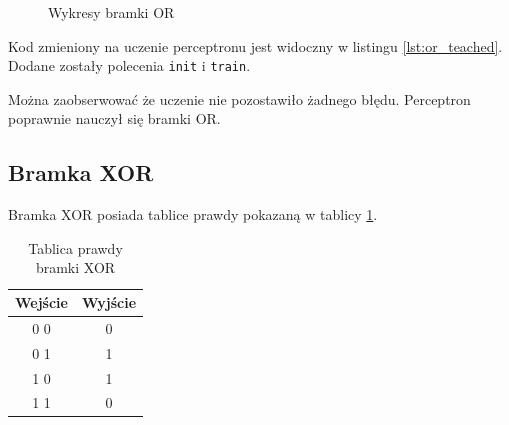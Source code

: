\documentclass[pointlessnumbers, abstracton, headsepline, a4paper]{scrartcl}
\begin{document}
\begin{figure}[!h]
\caption{\label{fig:or}Wykresy bramki OR}
\end{figure}

Kod zmieniony na uczenie perceptronu jest widoczny w listingu \ref{lst:or_teached}. Dodane zostały polecenia \texttt{init} i \texttt{train}.

\begin{center}
\begin{minipage}{0.5\textwidth}
\lstset{captionpos=b,caption=Kod uczonej bramki OR,label=lst:or_teached}

\end{minipage}
\end{center}

Można zaobserwować że uczenie nie pozostawiło żadnego błędu. Perceptron poprawnie nauczył się bramki OR.

\subsection{Bramka XOR}

Bramka XOR posiada tablice prawdy pokazaną w tablicy \ref{tab:xor}.

\begin{table}[h]
\centering
\begin{tabular}[t]{c|c}
Wejście & Wyjście \\
\hline
0 0 & 0 \\
0 1 & 1 \\
1 0 & 1 \\
1 1 & 0 \\
\end{tabular}
\caption{\label{tab:xor}Tablica prawdy bramki XOR}
\end{table}
\end{document}
